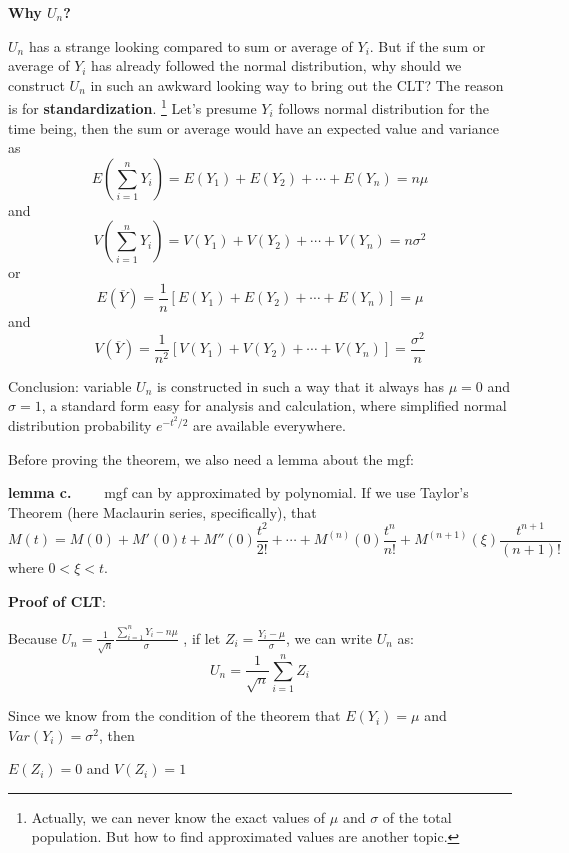 \documentclass[11pt]{article}
\begin{document}
\textbf{Why $U_n$?}

$U_n$ has a strange looking compared to sum or average of $Y_i$.  But if the sum or average of $Y_i$ has already followed the normal distribution,  why should we construct $U_n$ in such an awkward looking way to bring out the CLT?   The reason is for \textbf{standardization}.  \footnote{Actually,  we can never know the exact values of $\mu$ and $\sigma$ of the total population.  But how to find approximated values are another topic.} Let's presume $Y_i$ follows normal distribution for the time being,  then the sum or average would have an expected value and variance as
$$
E\left( \sum ^n _{i=1} Y_i  \right) = E(Y_1) + E(Y_2) + \cdots + E(Y_n) = n\mu
$$
and \cite[p.~188]{larsen2012introduction}  
$$
V \left( \sum ^n _{i=1} Y_i  \right) = V(Y_1) + V(Y_2) + \cdots + V(Y_n) = n\sigma^2
$$
or
$$
E(\overline {Y}) = \frac{1}{n} [ E(Y_1) + E(Y_2) + \cdots + E(Y_n) ] = \mu
$$
and
$$
V( \overline {Y} ) = \frac{1}{n^2} [ V(Y_1) + V(Y_2) + \cdots + V(Y_n) ]  = \frac{\sigma^2}{n}
$$

Conclusion: variable $U_n$ is constructed in such a way that it always has $\mu = 0$ and $\sigma = 1$,  a standard form easy for analysis and calculation, where simplified normal distribution probability $e^{-t^2/2}$ are available everywhere. 

Before proving the theorem,  we also need a lemma about the mgf:

\begin{tcolorbox}[
	enhanced, 
	width=\textwidth, 
	fontupper=\normalsize,%
	drop fuzzy shadow southwest,
	boxrule=0.4pt,
	sharp corners,
	colframe=yellow!80!black,
	colback=yellow!10]
	
\textbf{\color{RoyalBlue} lemma c.} \ \ \ \ mgf can by approximated by polynomial.  If we use Taylor's Theorem (here Maclaurin series,  specifically),  that 
$$
M(t) = M(0) + M'(0)t + M''(0)\frac{t^2}{2!} + \cdots + M^{(n)}(0)\frac{ t^n}{n!} + M^{(n+1)}(\xi) \frac{t^{n+1}}{(n+1)!}
$$
where $0<\xi<t$.
\end{tcolorbox}


\textbf{Proof of CLT}:

\hspace{5pt}

Because $ \displaystyle U_n = \frac{1}{\sqrt{n}} \frac{ \sum ^n _{i=1} Y_i - n \mu}{\sigma}$ ,  if let $\displaystyle Z_i =  \frac{Y_i - \mu}{\sigma}$, we can write $U_n$ as:
$$
U_n = \frac{1}{\sqrt{n}} \sum ^n _{i=1} Z_i
$$

Since we know from the condition of the theorem that $E(Y_i) = \mu$ and $ Var (Y_i) = \sigma^2$,  then
\begin{center}
$E(Z_i) = 0$ \hspace{10pt} and \hspace{10pt} $V(Z_i) = 1$
\end{center}
\end{document}
